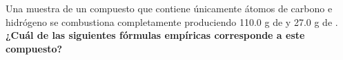 Una muestra de un compuesto que contiene únicamente átomos de carbono e hidrógeno se combustiona completamente produciendo 110.0 g de  y 27.0 g de .
\textbf{¿Cuál de las siguientes fórmulas empíricas corresponde a este compuesto?}

\begin{choices}
    \choice  {}
    \choice  {}
    \choice  {}
    \choice  {}
\end{choices}